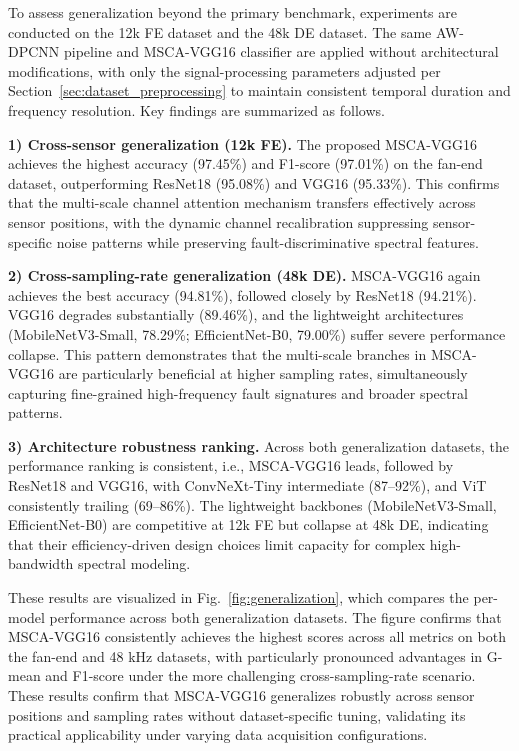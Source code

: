 \documentclass[pdflatex,sn-mathphys-num]{sn-jnl}
\theoremstyle{thmstyleone}%
\theoremstyle{thmstyletwo}%
\theoremstyle{thmstylethree}%
\begin{document}
To assess generalization beyond the primary benchmark, experiments are conducted on the 12k FE dataset and the 48k DE dataset. The same AW-DPCNN pipeline and MSCA-VGG16 classifier are applied without architectural modifications, with only the signal-processing parameters adjusted per Section~\ref{sec:dataset_preprocessing} to maintain consistent temporal duration and frequency resolution. Key findings are summarized as follows.

\textbf{1) Cross-sensor generalization (12k FE).} The proposed MSCA-VGG16 achieves the highest accuracy (97.45\%) and F1-score (97.01\%) on the fan-end dataset, outperforming ResNet18 (95.08\%) and VGG16 (95.33\%). This confirms that the multi-scale channel attention mechanism transfers effectively across sensor positions, with the dynamic channel recalibration suppressing sensor-specific noise patterns while preserving fault-discriminative spectral features.

\textbf{2) Cross-sampling-rate generalization (48k DE).} MSCA-VGG16 again achieves the best accuracy (94.81\%), followed closely by ResNet18 (94.21\%). VGG16 degrades substantially (89.46\%), and the lightweight architectures (MobileNetV3-Small, 78.29\%; EfficientNet-B0, 79.00\%) suffer severe performance collapse. This pattern demonstrates that the multi-scale branches in MSCA-VGG16 are particularly beneficial at higher sampling rates, simultaneously capturing fine-grained high-frequency fault signatures and broader spectral patterns.

\textbf{3) Architecture robustness ranking.} Across both generalization datasets, the performance ranking is consistent, i.e., MSCA-VGG16 leads, followed by ResNet18 and VGG16, with ConvNeXt-Tiny intermediate (87--92\%), and ViT consistently trailing (69--86\%). The lightweight backbones (MobileNetV3-Small, EfficientNet-B0) are competitive at 12k FE but collapse at 48k DE, indicating that their efficiency-driven design choices limit capacity for complex high-bandwidth spectral modeling.

These results are visualized in Fig.~\ref{fig:generalization}, which compares the per-model performance across both generalization datasets. The figure confirms that MSCA-VGG16 consistently achieves the highest scores across all metrics on both the fan-end and 48 kHz datasets, with particularly pronounced advantages in G-mean and F1-score under the more challenging cross-sampling-rate scenario. These results confirm that MSCA-VGG16 generalizes robustly across sensor positions and sampling rates without dataset-specific tuning, validating its practical applicability under varying data acquisition configurations.
\end{document}
